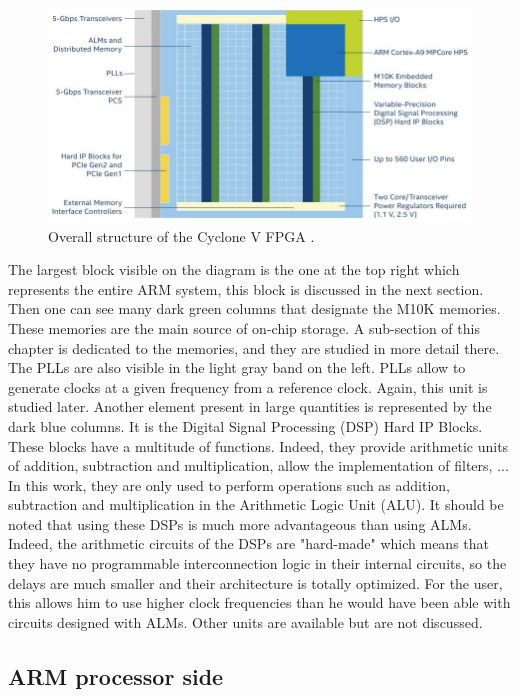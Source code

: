 \begin{figure}[H]
    \centering
    \includegraphics[scale=0.6]{Chapter1-Hardware/res/cycv_structure.PNG}
    \caption{Overall structure 
    of the Cyclone V FPGA \cite{cyc_web}.}
    \label{fig:cyc5/structure}
\end{figure}

The largest block visible on the diagram is the one at the top right which represents the entire ARM
system, this block is discussed in the next section. Then one can see many dark 
green columns that designate the M10K memories. These memories are the main source of on-chip 
storage.  A sub-section of this chapter is dedicated to the memories, and they are studied in more 
detail there. The PLLs are also visible in the light gray band on the left. PLLs allow to 
generate clocks at a given frequency from a reference clock. Again, this unit is studied later. 
Another element present in large quantities is represented by the dark blue columns. It is the 
Digital Signal Processing (DSP) Hard IP Blocks. These blocks have a multitude of functions. Indeed, 
they provide arithmetic units of addition, subtraction and multiplication, allow the implementation 
of filters, ... In this work, they are only used to perform operations such as addition, 
subtraction and multiplication in the Arithmetic Logic Unit (ALU). It should be noted that using 
these DSPs is much more advantageous than using ALMs. Indeed, the arithmetic circuits of the DSPs 
are "hard-made" which means that they have no programmable interconnection logic in their internal 
circuits, so the delays are much smaller and their architecture is totally optimized. For the user, 
this allows him to use higher clock frequencies than he would have been able with circuits designed
with ALMs. Other units are available but are not discussed.

\subsection{ARM processor side}

